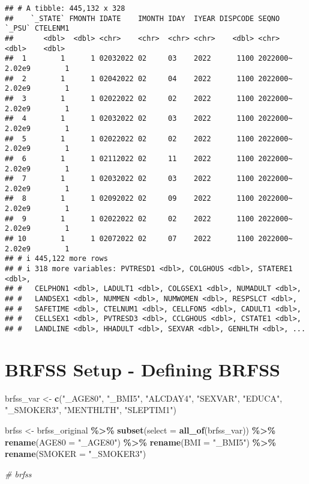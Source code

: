 \documentclass[
]{article}
\newenvironment{Shaded}{\begin{snugshade}}{\end{snugshade}}
\newcommand{\AttributeTok}[1]{\textcolor[rgb]{0.13,0.29,0.53}{#1}}
\newcommand{\CommentTok}[1]{\textcolor[rgb]{0.56,0.35,0.01}{\textit{#1}}}
\newcommand{\FunctionTok}[1]{\textcolor[rgb]{0.13,0.29,0.53}{\textbf{#1}}}
\newcommand{\NormalTok}[1]{#1}
\newcommand{\OtherTok}[1]{\textcolor[rgb]{0.56,0.35,0.01}{#1}}
\newcommand{\SpecialCharTok}[1]{\textcolor[rgb]{0.81,0.36,0.00}{\textbf{#1}}}
\newcommand{\StringTok}[1]{\textcolor[rgb]{0.31,0.60,0.02}{#1}}
\begin{document}
\begin{verbatim}
## # A tibble: 445,132 x 328
##    `_STATE` FMONTH IDATE    IMONTH IDAY  IYEAR DISPCODE SEQNO    `_PSU` CTELENM1
##       <dbl>  <dbl> <chr>    <chr>  <chr> <chr>    <dbl> <chr>     <dbl>    <dbl>
##  1        1      1 02032022 02     03    2022      1100 2022000~ 2.02e9        1
##  2        1      1 02042022 02     04    2022      1100 2022000~ 2.02e9        1
##  3        1      1 02022022 02     02    2022      1100 2022000~ 2.02e9        1
##  4        1      1 02032022 02     03    2022      1100 2022000~ 2.02e9        1
##  5        1      1 02022022 02     02    2022      1100 2022000~ 2.02e9        1
##  6        1      1 02112022 02     11    2022      1100 2022000~ 2.02e9        1
##  7        1      1 02032022 02     03    2022      1100 2022000~ 2.02e9        1
##  8        1      1 02092022 02     09    2022      1100 2022000~ 2.02e9        1
##  9        1      1 02022022 02     02    2022      1100 2022000~ 2.02e9        1
## 10        1      1 02072022 02     07    2022      1100 2022000~ 2.02e9        1
## # i 445,122 more rows
## # i 318 more variables: PVTRESD1 <dbl>, COLGHOUS <dbl>, STATERE1 <dbl>,
## #   CELPHON1 <dbl>, LADULT1 <dbl>, COLGSEX1 <dbl>, NUMADULT <dbl>,
## #   LANDSEX1 <dbl>, NUMMEN <dbl>, NUMWOMEN <dbl>, RESPSLCT <dbl>,
## #   SAFETIME <dbl>, CTELNUM1 <dbl>, CELLFON5 <dbl>, CADULT1 <dbl>,
## #   CELLSEX1 <dbl>, PVTRESD3 <dbl>, CCLGHOUS <dbl>, CSTATE1 <dbl>,
## #   LANDLINE <dbl>, HHADULT <dbl>, SEXVAR <dbl>, GENHLTH <dbl>, ...
\end{verbatim}

\section{BRFSS Setup - Defining
BRFSS}\label{brfss-setup---defining-brfss}

\begin{Shaded}
\begin{Highlighting}[]
\NormalTok{brfss\_var }\OtherTok{\textless{}{-}} \FunctionTok{c}\NormalTok{(}\StringTok{"\_AGE80"}\NormalTok{, }\StringTok{"\_BMI5"}\NormalTok{, }\StringTok{"ALCDAY4"}\NormalTok{, }\StringTok{"SEXVAR"}\NormalTok{, }\StringTok{"EDUCA"}\NormalTok{, }\StringTok{"\_SMOKER3"}\NormalTok{, }\StringTok{"MENTHLTH"}\NormalTok{, }\StringTok{"SLEPTIM1"}\NormalTok{)}

\NormalTok{brfss }\OtherTok{\textless{}{-}}\NormalTok{ brfss\_original }\SpecialCharTok{\%\textgreater{}\%}   
  \FunctionTok{subset}\NormalTok{(}\AttributeTok{select =} \FunctionTok{all\_of}\NormalTok{(brfss\_var)) }\SpecialCharTok{\%\textgreater{}\%} 
  \FunctionTok{rename}\NormalTok{(}\AttributeTok{AGE80 =} \StringTok{"\_AGE80"}\NormalTok{) }\SpecialCharTok{\%\textgreater{}\%} 
  \FunctionTok{rename}\NormalTok{(}\AttributeTok{BMI =} \StringTok{"\_BMI5"}\NormalTok{) }\SpecialCharTok{\%\textgreater{}\%} 
  \FunctionTok{rename}\NormalTok{(}\AttributeTok{SMOKER =} \StringTok{"\_SMOKER3"}\NormalTok{) }

\CommentTok{\# brfss}
\end{Highlighting}
\end{Shaded}
\end{document}
